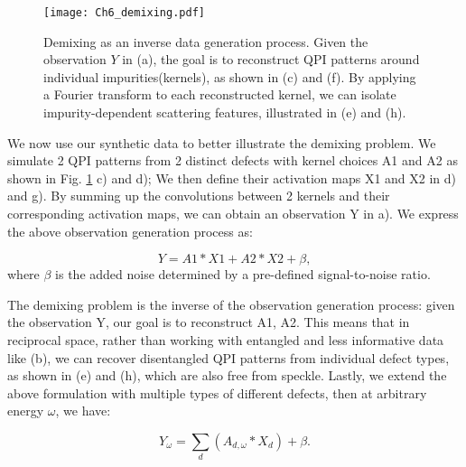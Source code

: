 \begin{figure}
	\texttt{[image: Ch6\_demixing.pdf]} 
	\centering
	\caption{Demixing as an inverse data generation process. Given the observation 
		$Y$ in (a), the goal is to reconstruct QPI patterns around individual impurities(kernels), as shown in (c) and (f). By applying a Fourier transform to each reconstructed kernel, we can isolate impurity-dependent scattering features, illustrated in (e) and (h).}
	\label{fig:ch6_demix}
\end{figure}

We now use our synthetic data to better illustrate the demixing problem. We simulate 2 \ac{QPI} patterns from 2 distinct defects with kernel choices A1 and A2 as shown in Fig. \ref{fig:ch6_demix} c) and d); We then define their activation maps X1 and X2 in d) and g). By summing up the convolutions between 2 kernels and their corresponding activation maps, we can obtain an observation Y in a). We express the above observation generation process as:

\begin{equation}
	Y = A1 * X1 + A2 * X2 + \beta, 
\end{equation}
where $\beta$ is the added noise determined by a pre-defined signal-to-noise ratio.

The demixing problem is the inverse of the observation generation process: given the observation Y, our goal is to reconstruct A1, A2. This means that in reciprocal space, rather than working with entangled and less informative data like (b), we can recover disentangled QPI patterns from individual defect types, as shown in (e) and (h), which are also free from speckle. Lastly, we extend the above formulation with multiple types of different defects, then at arbitrary energy $\omega$, we have: 

\begin{equation}
	\label{eq:demixing}
	Y_{\omega} = \sum_d ( A_{d,{\omega}} * X_d) + \beta. 
\end{equation} 



